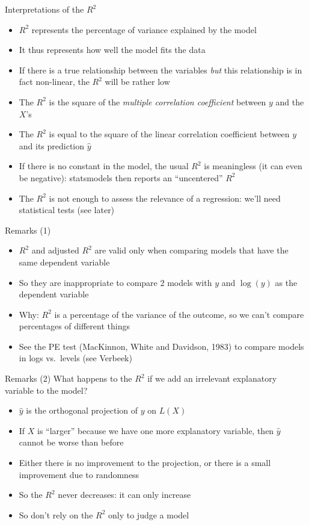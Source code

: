 \documentclass[aspectratio=169]{beamer}
\begin{document}
\begin{frame}{Interpretations of the $R^2$}
\begin{itemize}
    \item $R^2$ represents the percentage of variance explained by the model
    \item It thus represents how well the model fits the data
    \item If there is a true relationship between the variables \textit{but} this relationship is in fact non-linear, the $R^2$ will be rather low
    \item The $R^2$ is the square of the \textit{multiple correlation coefficient} between $y$ and the $X$'s
    \item The $R^2$ is equal to the square of the linear correlation coefficient between $y$ and its prediction $\hat{y}$
    \item If there is no constant in the model, the usual $R^2$ is meaningless (it can even be negative): statsmodels then reports an ``uncentered'' $R^2$
    \item The $R^2$ is not enough to assess the relevance of a regression: we'll need statistical tests (see later)
\end{itemize}
\end{frame}

\begin{frame}{Remarks (1)}
\begin{itemize}
    \item $R^2$ and adjusted $R^2$ are valid only when comparing models that have the same dependent variable
    \item So they are inappropriate to compare 2 models with $y$ and $\log(y)$ as the dependent variable
    \item Why: $R^2$ is a percentage of the variance of the outcome, so we can't compare percentages of different things
    \item See the PE test (MacKinnon, White and Davidson, 1983) to compare models in logs vs.\ levels (see Verbeek)
\end{itemize}
\end{frame}

\begin{frame}{Remarks (2)}
What happens to the $R^2$ if we add an irrelevant explanatory variable to the model?

\begin{itemize}
    \item $\hat{y}$ is the orthogonal projection of $y$ on $L(X)$
    \item If $X$ is ``larger'' because we have one more explanatory variable, then $\hat{y}$ cannot be worse than before
    \item Either there is no improvement to the projection, or there is a small improvement due to randomness
    \item So the $R^2$ never decreases: it can only increase
    \item So don't rely on the $R^2$ only to judge a model
\end{itemize}
\end{frame}
\end{document}
